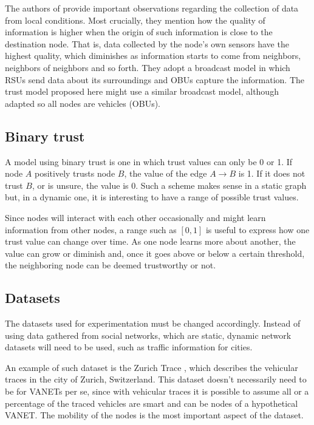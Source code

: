 The authors of \cite{patwardhan2006data} provide important observations regarding the collection of data from local conditions.
Most crucially, they mention how the quality of information is higher when the origin of such information is close to the destination node.
That is, data collected by the node's own sensors have the highest quality, which diminishes as information starts to come from neighbors, neighbors of neighbors and so forth.
They adopt a broadcast model in which RSUs send data about its surroundings and OBUs capture the information.
The trust model proposed here might use a similar broadcast model, although adapted so all nodes are vehicles (OBUs).

\subsection{Binary trust}
A model using binary trust is one in which trust values can only be 0 or 1.
If node $A$ positively trusts node $B$, the value of the edge $A\rightarrow B$ is 1.
If it does not trust $B$, or is unsure, the value is 0.
Such a scheme makes sense in a static graph but, in a dynamic one, it is interesting to have a range of possible trust values.

Since nodes will interact with each other occasionally and might learn information from other nodes, a range such as $[0,1]$ is useful to express how one trust value can change over time.
As one node learns more about another, the value can grow or diminish and, once it goes above or below a certain threshold, the neighboring node can be deemed trustworthy or not.

\subsection{Datasets}
The datasets used for experimentation must be changed accordingly.
Instead of using data gathered from social networks, which are static, dynamic network datasets will need to be used, such as traffic information for cities.

An example of such dataset is the Zurich Trace \cite{zurichtrace}, which describes the vehicular traces in the city of Zurich, Switzerland.
This dataset doesn't necessarily need to be for VANETs per se, since with vehicular traces it is possible to assume all or a percentage of the traced vehicles are smart and can be nodes of a hypothetical VANET.
The mobility of the nodes is the most important aspect of the dataset.


